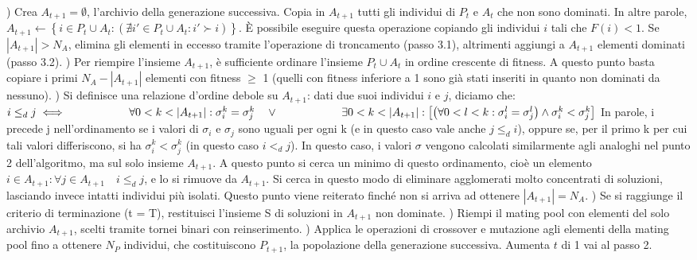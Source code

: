 \documentclass[12pt]{article}
\begin{document}
\tab {}) Crea $A_{t+1} = \emptyset$, l'archivio della generazione successiva. Copia in $A_{t+1}$ tutti gli individui di $P_t$ e $A_t$ che non sono dominati. In altre parole, $A_{t+1} \leftarrow \left\{ i \in P_t \cup A_t : \left( \nexists i' \in P_t \cup A_t : i' \succ i \right) \right\}$. È possibile eseguire questa operazione copiando gli individui $i$ tali che $F(i) < 1$. Se $|A_{t+1}| > N_A$, elimina gli elementi in eccesso tramite l'operazione di troncamento (passo 3.1), altrimenti aggiungi a $A_{t+1}$ elementi dominati (passo 3.2). \newline
\tab {}) Per riempire l'insieme $A_{t+1}$, è sufficiente ordinare l'insieme $P_t \cup A_t$ in ordine crescente di fitness. A questo punto basta copiare i primi $N_A - |A_{t+1}|$ elementi con fitness $\geq$ 1 (quelli con fitness inferiore a 1 sono già stati inseriti in quanto non dominati da nessuno). \newline
\tab {}) Si definisce una relazione d'ordine debole su $A_{t+1}$: dati due suoi individui $i$ e $j$, diciamo che: \newline
\newline
$i \leq_d j \iff \newline
\hspace*{2cm} \forall  0 < k < |A_{t+1}| : \sigma_i^k = \sigma_j^k \quad \lor \newline
\hspace*{2cm} \exists 0 < k < |A_{t+1}| : \left[ \left( \forall 0 < l < k : \sigma_i^l = \sigma_j^l \right) \land \sigma_i^k < \sigma_j^k \right]$ \newline 
\newline
In parole, i precede j nell'ordinamento se i valori di $\sigma_i$ e $\sigma_j$ sono uguali per ogni k (e in questo caso vale anche $j \leq_d i$), oppure se, per il primo k per cui tali valori differiscono, si ha $\sigma_i^k < \sigma_j^k$ (in questo caso $i <_d j$).
In questo caso, i valori $\sigma$ vengono calcolati similarmente agli analoghi nel punto 2 dell'algoritmo, ma sul solo insieme $A_{t+1}$. A questo punto si cerca un minimo di questo ordinamento, cioè un elemento \newline $i \in A_{t+1} : \forall j \in A_{t+1} \quad i \leq_d j$, e lo si rimuove da $A_{t+1}$. Si cerca in questo modo di eliminare agglomerati molto concentrati di soluzioni, lasciando invece intatti individui più isolati. Questo punto viene reiterato finché non si arriva ad ottenere $|A_{t+1}| = N_A$. \newline
\tab {}) Se si raggiunge il criterio di terminazione (t = T), restituisci l'insieme S di soluzioni in $A_{t+1}$ non dominate.\newline
\tab {}) Riempi il mating pool con elementi del solo archivio $A_{t+1}$, scelti tramite tornei binari con reinserimento. \newline
\tab {}) Applica le operazioni di crossover e mutazione agli elementi della mating pool fino a ottenere $N_P$ individui, che costituiscono $P_{t+1}$, la popolazione della generazione successiva. Aumenta $t$ di 1 vai al passo 2. \newline
\end{document}
